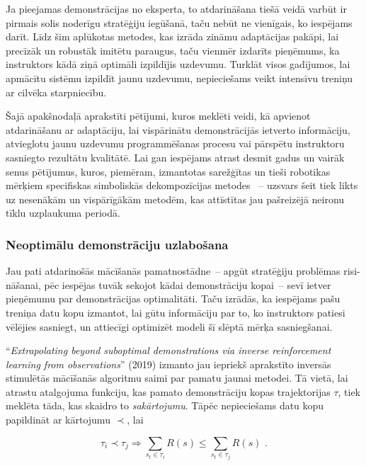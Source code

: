 \documentclass[12pt, a4paper]{article}
\numberwithin{equation}{section} %
\begin{document}
Ja pieejamas demonstrācijas no eksperta, to atdarināšana tiešā veidā varbūt ir pirmais solis noderīgu stratēģiju iegūšanā, taču nebūt ne vienīgais, ko iespējams darīt. Līdz šim aplūkotas metodes, kas izrāda zināmu adaptācijas pakāpi, lai precīzāk un robustāk imitētu paraugus, taču vienmēr izdarīts pieņēmums, ka instruktors kādā ziņā optimāli izpildījis uzdevumu. Turklāt visos gadījumos, lai apmācītu sistēmu izpildīt jaunu uzdevumu, nepieciešams veikt intensīvu treniņu ar cilvēka starpniecību. 

Šajā apakšnodaļā aprakstīti pētījumi, kuros meklēti veidi, kā apvienot atdarināšanu ar adaptāciju, lai vispārinātu demonstrācijās ietverto informāciju, atvieglotu jaunu uzdevumu programmēšanas procesu vai pārspētu instruktoru sasniegto rezultātu kvalitātē. Lai gan iespējams atrast desmit gadus un vairāk senus pētījumus, kuros, piemēram, izmantotas sarežģītas un tieši robotikas mērķiem specifiskas simboliskās dekompozīcijas metodes \cite{pastor2011skill}~-- uzsvars šeit tiek likts uz nesenākām un vispārīgākām metodēm, kas attīstītas jau pašreizējā neironu tīklu uzplaukuma periodā.

\subsubsection{Neoptimālu demonstrāciju uzlabošana}

Jau pati atdarinošās mācīšanās pamatnostādne~-- apgūt stratēģiju problēmas risi-nāšanai, pēc iespējas tuvāk sekojot kādai demonstrāciju kopai~-- sevī ietver pieņēmumu par demonstrācijas optimalitāti. Taču izrādās, ka iespējams pašu treniņa datu kopu izmantot, lai gūtu informāciju par to, ko instruktors patiesi vēlējies sasniegt, un attiecīgi optimizēt modeli šī slēptā mērķa sasniegšanai.

``\textit{Extrapolating beyond suboptimal demonstrations via inverse reinforcement learning from observations}'' \cite{brown2019extrapolating} (2019) izmanto jau iepriekš aprakstīto inversās stimulētās mācīšanās algoritmu saimi par pamatu jaunai metodei. Tā vietā, lai atrastu atalgojuma funkciju, kas pamato demonstrāciju kopas trajektorijas $\tau$, tiek meklēta tāda, kas skaidro to \textit{sakārtojumu}. Tāpēc nepieciešams datu kopu papildināt ar kārtojumu $\prec$, lai

\begin{equation}
    \tau_i \prec \tau_j \Rightarrow \sum_{s_t \in \tau_i}R(s) \leq \sum_{s_t \in \tau_j}R(s)
\text{ .}
\end{equation}
\end{document}

